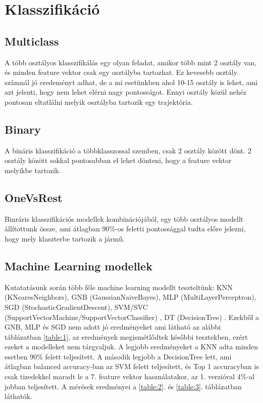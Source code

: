 \documentclass[acmtog, authorversion]{acmart}
\begin{document}
\section{Klasszifikáció}
\subsection{Multiclass}
A több osztályos klasszifikálás egy olyan feladat, amikor több mint 2 osztály van, és minden feature vektor csak egy osztályba tartozhat.
Ez kevesebb osztály számnál jó eredeményt adhat, de a mi esetünkben ahol 10-15 osztály is lehet, ami azt jelenti, hogy nem lehet elérni nagy
pontosságot. Ennyi osztály közül nehéz pontosan eltatlálni melyik osztályba tartozik egy trajektória.
\subsection{Binary}
A bináris klasszifikáció a többklasszossal szemben, csak 2 osztály között dönt. 2 osztály között sokkal pontosabban el lehet dönteni,
hogy a feature vektor melyikbe tartozik.
\subsection{OneVsRest}
Binráris klasszifikációs modellek kombinációjából, egy több osztályos modellt állítottunk össze, ami átlagban 90\%-os feletti pontossággal tudta előre
jelezni, hogy mely klaszterbe tartozik a jármű.
\subsection{Machine Learning modellek}
Kutatatásunk során több féle machine learning modellt teszteltünk: KNN (KNearesNeighbors), GNB (GaussianNaiveBayes), MLP (MultiLayerPerceptron), 
SGD (StochasticGradientDescent), SVM/SVC (SupportVectorMachine/SupportVectorClassifier) \cite{CC01a}, DT (DecisionTree) \cite{Breiman1984ClassificationAR}.
Ezekből a GNB, MLP és SGD nem adott jó eredményeket ami látható az alábbi táblázatban \ref{table:1}, az eredmények megismétlődtek későbbi tesztekben, ezért
ezeket a modelleket nem tárgyaljuk. A legjobb eredményeket a KNN adta minden esetben 90\% felett teljesített. A második legjobb a DecisionTree lett, ami átlagban
balanced accuracy-ban az SVM felett teljesített, és Top 1 accuracyban is csak tizedekkel maradt le a 7. feature vektor használatakor, az 1. verzióval 4\%-al
jobban teljesített. A mérések eredményei a \ref{table:2}. és \ref{table:3}. táblázatban láthatók. 
\end{document}
